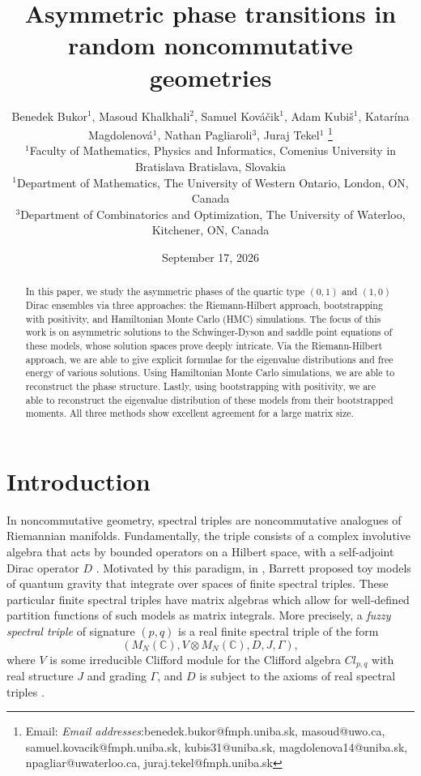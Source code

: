 \documentclass[10pt]{article}
\date{September 17, 2026}
\title{Asymmetric phase transitions in random noncommutative geometries}
\author{
Benedek Bukor$^{1}$,
Masoud Khalkhali$^{2}$,
Samuel Kov\'{a}\v{c}ik$^{1}$,
Adam Kubiš$^{1}$,
Katarína Magdolenová$^{1}$,
Nathan Pagliaroli$^{3}$,
Juraj Tekel$^{1}$ \thanks{Email: \emph{Email addresses}:benedek.bukor@fmph.uniba.sk, masoud@uwo.ca, samuel.kovacik@fmph.uniba.sk, 
\newline kubis31@uniba.sk, magdolenova14@uniba.sk, npagliar@uwaterloo.ca, juraj.tekel@fmph.uniba.sk}
\\
$^{1}$Faculty of Mathematics, Physics and Informatics,
Comenius University in Bratislava Bratislava, Slovakia\\
$^{1}$Department of Mathematics, The University of Western Ontario, London, ON, Canada\\
$^{3}$Department of Combinatorics and Optimization, The University of Waterloo, Kitchener, ON, Canada}
\theoremstyle{plain}
\theoremstyle{definition}
\theoremstyle{plain}
\begin{document}
	\maketitle
	\begin{abstract}
 In this paper, we study the asymmetric phases of the quartic type $(0,1)$ and $(1,0)$ Dirac ensembles via three approaches: the Riemann-Hilbert approach, bootstrapping with positivity, and Hamiltonian Monte Carlo (HMC) simulations. The focus of this work is on asymmetric solutions to the Schwinger-Dyson and saddle point equations of these models, whose solution spaces prove deeply intricate. Via the Riemann-Hilbert approach, we are able to give explicit formulae for the eigenvalue distributions and free energy of various solutions. Using Hamiltonian Monte Carlo simulations, we are able to reconstruct the phase structure. Lastly, using bootstrapping with positivity, we are able to reconstruct the eigenvalue distribution of these models from their bootstrapped moments. All three methods show excellent agreement for a large matrix size.
	\end{abstract}
	\tableofcontents
	\section{Introduction}
In noncommutative geometry, spectral triples are noncommutative analogues of Riemannian manifolds. Fundamentally, the triple consists of a complex involutive algebra that acts by bounded operators on a Hilbert space, with a self-adjoint Dirac operator $D$ \cite{connes1995noncommutative}. Motivated by this paradigm, in \cite{barrett2015matrix}, Barrett proposed toy models of quantum gravity that integrate over spaces of finite spectral triples. These particular finite spectral triples have matrix algebras which allow for well-defined partition functions of such models as matrix integrals. More precisely, a \textit{fuzzy spectral triple} of signature $(p, q)$ is a real finite spectral triple of
the form
$$(M_{N}(\mathbb{C}), V\otimes M_{N} (\mathbb{C}), D, J, \Gamma ),$$
where $V$ is some irreducible Clifford module for the Clifford algebra $Cl_{p,q}$ with real structure $J$ and grading $\Gamma$, and $D$ is subject to the axioms of real spectral triples \cite{barrett2015matrix}. 
\end{document}
